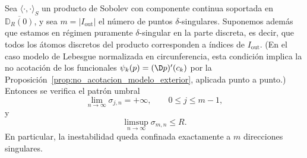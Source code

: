 \begin{thm}\label{thm:umbral_singular_indice_m_enunciado}
	Sea $\langle\cdot,\cdot\rangle_S$ un producto de Sobolev con componente continua soportada en
	$\overline{\mathbb D_R(0)}$, y sea $m=|I_{\mathrm{out}}|$ el número de puntos $\delta$-singulares.
	Suponemos además que estamos en régimen puramente $\delta$-singular en la parte discreta, es decir,
	que todos los átomos discretos del producto corresponden a índices de $I_{\mathrm{out}}$.
	(En el caso modelo de Lebesgue normalizada en circunferencia, esta condición implica la
	no acotación de los funcionales $\psi_k(p)=(\D p)'(c_k)$ por la
	Proposición~\ref{prop:no_acotacion_modelo_exterior}, aplicada punto a punto.)
	Entonces se verifica el patrón umbral
	\[
		\lim_{n\to\infty}\sigma_{j,n}=+\infty,
		\qquad 0\le j\le m-1,
	\]
	y
	\[
		\limsup_{n\to\infty}\sigma_{m,n}\le R.
	\]
	En particular, la inestabilidad queda confinada exactamente a $m$ direcciones singulares.
\end{thm}

